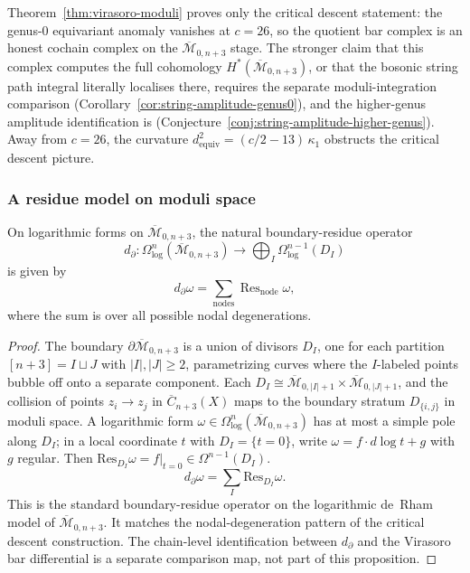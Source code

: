 \begin{remark}
\label{rem:virasoro-bar-moduli-polyakov}
Theorem~\ref{thm:virasoro-moduli} proves only the critical descent
statement: the genus-$0$ equivariant anomaly vanishes at $c = 26$, so
the quotient bar complex is an honest cochain complex on the
$\overline{\mathcal{M}}_{0,n+3}$ stage. The stronger claim that this
complex computes the full cohomology
$H^*(\overline{\mathcal{M}}_{0,n+3})$, or that the bosonic string path
integral literally localises there, requires the separate
moduli-integration comparison
\textup{(}Corollary~\ref{cor:string-amplitude-genus0}\textup{)}, and
the higher-genus amplitude identification is
\textup{(}Conjecture~\ref{conj:string-amplitude-higher-genus}\textup{)}.
Away from $c = 26$, the curvature
$d_{\mathrm{equiv}}^2 = (c/2 - 13)\,\kappa_1$ obstructs the critical
descent picture.
\end{remark}

\subsubsection{A residue model on moduli space}

\begin{proposition}
\label{prop:moduli-degeneration}
On logarithmic forms on $\overline{\mathcal{M}}_{0,n+3}$, the natural
boundary-residue operator
\[
d_{\partial}\colon \Omega^n_{\log}(\overline{\mathcal{M}}_{0,n+3})
\longrightarrow
\bigoplus_I \Omega^{n-1}_{\log}(D_I)
\]
is given by
\[
d_{\partial}\omega = \sum_{\text{nodes}} \operatorname{Res}_{\text{node}} \omega,
\]
where the sum is over all possible nodal degenerations.
\end{proposition}

\begin{proof}
The boundary $\partial\overline{\mathcal{M}}_{0,n+3}$ is a union of divisors $D_I$, one for each partition $[n+3] = I \sqcup J$ with $|I|, |J| \geq 2$, parametrizing curves where the $I$-labeled points bubble off onto a separate component. Each $D_I \cong \overline{\mathcal{M}}_{0,|I|+1} \times \overline{\mathcal{M}}_{0,|J|+1}$, and the collision of points $z_i \to z_j$ in $\overline{C}_{n+3}(X)$ maps to the boundary stratum $D_{\{i,j\}}$ in moduli space. A logarithmic form $\omega \in \Omega^n_{\log}(\overline{\mathcal{M}}_{0,n+3})$ has at most a simple pole along $D_I$; in a local coordinate $t$ with $D_I = \{t = 0\}$, write $\omega = f \cdot d\log t + g$ with $g$ regular. Then $\mathrm{Res}_{D_I}\omega = f|_{t=0} \in \Omega^{n-1}(D_I)$.
\[
d_{\partial}\omega = \sum_I \mathrm{Res}_{D_I}\omega.
\]
This is the standard boundary-residue operator on the logarithmic
de~Rham model of $\overline{\mathcal{M}}_{0,n+3}$. It matches the
nodal-degeneration pattern of the critical descent construction. The
chain-level identification between $d_{\partial}$ and the Virasoro bar
differential is a separate comparison map, not part of this
proposition.
\end{proof}

